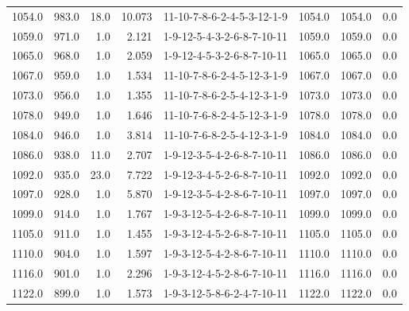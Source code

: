 \begin{tabular}{rrrrlrrr}
 1054.0 &   983.0 &           18.0 &             10.073 &  11-10-7-8-6-2-4-5-3-12-1-9 &        1054.0 &          1054.0 &       0.0 \\
 1059.0 &   971.0 &            1.0 &              2.121 &  1-9-12-5-4-3-2-6-8-7-10-11 &        1059.0 &          1059.0 &       0.0 \\
 1065.0 &   968.0 &            1.0 &              2.059 &  1-9-12-4-5-3-2-6-8-7-10-11 &        1065.0 &          1065.0 &       0.0 \\
 1067.0 &   959.0 &            1.0 &              1.534 &  11-10-7-8-6-2-4-5-12-3-1-9 &        1067.0 &          1067.0 &       0.0 \\
 1073.0 &   956.0 &            1.0 &              1.355 &  11-10-7-8-6-2-5-4-12-3-1-9 &        1073.0 &          1073.0 &       0.0 \\
 1078.0 &   949.0 &            1.0 &              1.646 &  11-10-7-6-8-2-4-5-12-3-1-9 &        1078.0 &          1078.0 &       0.0 \\
 1084.0 &   946.0 &            1.0 &              3.814 &  11-10-7-6-8-2-5-4-12-3-1-9 &        1084.0 &          1084.0 &       0.0 \\
 1086.0 &   938.0 &           11.0 &              2.707 &  1-9-12-3-5-4-2-6-8-7-10-11 &        1086.0 &          1086.0 &       0.0 \\
 1092.0 &   935.0 &           23.0 &              7.722 &  1-9-12-3-4-5-2-6-8-7-10-11 &        1092.0 &          1092.0 &       0.0 \\
 1097.0 &   928.0 &            1.0 &              5.870 &  1-9-12-3-5-4-2-8-6-7-10-11 &        1097.0 &          1097.0 &       0.0 \\
 1099.0 &   914.0 &            1.0 &              1.767 &  1-9-3-12-5-4-2-6-8-7-10-11 &        1099.0 &          1099.0 &       0.0 \\
 1105.0 &   911.0 &            1.0 &              1.455 &  1-9-3-12-4-5-2-6-8-7-10-11 &        1105.0 &          1105.0 &       0.0 \\
 1110.0 &   904.0 &            1.0 &              1.597 &  1-9-3-12-5-4-2-8-6-7-10-11 &        1110.0 &          1110.0 &       0.0 \\
 1116.0 &   901.0 &            1.0 &              2.296 &  1-9-3-12-4-5-2-8-6-7-10-11 &        1116.0 &          1116.0 &       0.0 \\
 1122.0 &   899.0 &            1.0 &              1.573 &  1-9-3-12-5-8-6-2-4-7-10-11 &        1122.0 &          1122.0 &       0.0 \\

\end{tabular}
